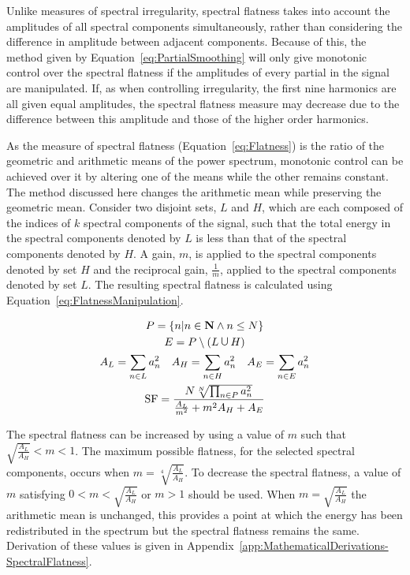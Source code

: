 		Unlike measures of spectral irregularity, spectral flatness takes into account the amplitudes of all
		spectral components simultaneously, rather than considering the difference in amplitude between adjacent
		components. Because of this, the method given by Equation~\ref{eq:PartialSmoothing} will only give
		monotonic control over the spectral flatness if the amplitudes of every partial in the signal are
		manipulated. If, as when controlling irregularity, the first nine harmonics are all given equal amplitudes,
		the spectral flatness measure may decrease due to the difference between this amplitude and those of the
		higher order harmonics.

		As the measure of spectral flatness (Equation~\ref{eq:Flatness}) is the ratio of the geometric and
		arithmetic means of the power spectrum, monotonic control can be achieved over it by altering one of the
		means while the other remains constant. The method discussed here changes the arithmetic mean while
		preserving the geometric mean. Consider two disjoint sets, $L$ and $H$, which are each composed of the
		indices of $k$ spectral components of the signal, such that the total energy in the spectral components
		denoted by $L$ is less than that of the spectral components denoted by $H$. A gain, $m$, is applied to the
		spectral components denoted by set $H$ and the reciprocal gain, $\frac{1}{m}$, applied to the spectral
		components denoted by set $L$. The resulting spectral flatness is calculated using
		Equation~\ref{eq:FlatnessManipulation}.

		\begin{gather}
			P = \left\{ n | n \in \textbf{N} \land n \leq N \right\} \nonumber \\
			E = P \setminus (L \medcup H) \nonumber \\
			A_{L} = \sum_{n \in L} a_{n}^{2} \quad A_{H} = \sum_{n \in H} a_{n}^{2}
			   \quad A_{E} = \sum_{n \in E} a_{n}^{2} \nonumber \\
			\mathrm{SF} = \frac{N\sqrt[N]{\prod_{n \in P} a_{n}^{2}}}
					   {\frac{A_{L}}{m^{2}} + m^{2}A_{H} + A_{E}}
			\label{eq:FlatnessManipulation}
		\end{gather}

		The spectral flatness can be increased by using a value of $m$ such that $\sqrt{\frac{A_{L}}{A_{H}}} < m <
		1$. The maximum possible flatness, for the selected spectral components, occurs when $m =
		\sqrt[4]{\frac{A_{L}}{A_{H}}}$. To decrease the spectral flatness, a value of $m$ satisfying $0 < m <
		\sqrt{\frac{A_{L}}{A_{H}}}$ or $m > 1$ should be used. When $m = \sqrt{\frac{A_{L}}{A_{H}}}$ the arithmetic
		mean is unchanged, this provides a point at which the energy has been redistributed in the spectrum but the
		spectral flatness remains the same. Derivation of these values is given in
		Appendix~\ref{app:MathematicalDerivations-SpectralFlatness}.

